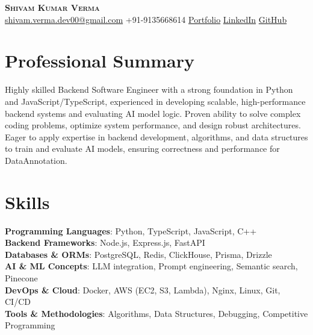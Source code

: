 \documentclass[letterpaper,10pt]{article}
\begin{document}
\begin{center}
  \textbf{\Huge \scshape Shivam Kumar Verma} \\ \vspace{4pt}
  \small \href{mailto:shivam.verma.dev00@gmail.com}{shivam.verma.dev00@gmail.com} \textbullet{} +91-9135668614 \textbullet{} \href{Portfolio}{Portfolio} \textbullet{} \href{LinkedIn}{LinkedIn} \textbullet{} \href{GitHub}{GitHub}
\end{center}

\section{Professional Summary}
\vspace{3pt}
\small{Highly skilled Backend Software Engineer with a strong foundation in Python and JavaScript/TypeScript, experienced in developing scalable, high-performance backend systems and evaluating AI model logic. Proven ability to solve complex coding problems, optimize system performance, and design robust architectures. Eager to apply expertise in backend development, algorithms, and data structures to train and evaluate AI models, ensuring correctness and performance for DataAnnotation.}

\section{Skills}
\begin{itemize}[leftmargin=0.15in, label={}]
  \small{\item{
    \textbf{Programming Languages}{: Python, TypeScript, JavaScript, C++} \\ \vspace{2pt}
    \textbf{Backend Frameworks}{: Node.js, Express.js, FastAPI} \\ \vspace{2pt}
    \textbf{Databases \& ORMs}{: PostgreSQL, Redis, ClickHouse, Prisma, Drizzle} \\ \vspace{2pt}
    \textbf{AI \& ML Concepts}{: LLM integration, Prompt engineering, Semantic search, Pinecone} \\ \vspace{2pt}
    \textbf{DevOps \& Cloud}{: Docker, AWS (EC2, S3, Lambda), Nginx, Linux, Git, CI/CD} \\ \vspace{2pt}
    \textbf{Tools \& Methodologies}{: Algorithms, Data Structures, Debugging, Competitive Programming}
  }}
\end{itemize}
\end{document}
